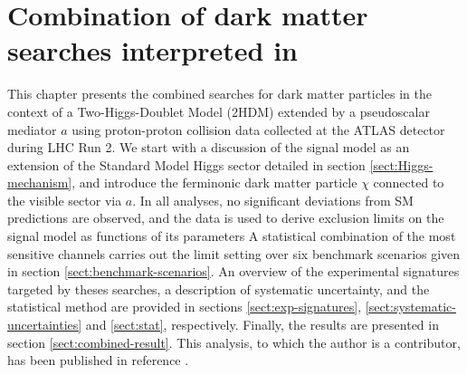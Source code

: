 \chapter{Combination of dark matter searches interpreted in \thdma}
\label{chap:combination-dark-matter-2hdma}

This chapter presents the combined searches for dark matter particles in the context of a Two-Higgs-Doublet Model (2HDM) extended 
by a pseudoscalar mediator $a$ using proton-proton collision data collected at the ATLAS detector during LHC Run 2. 
We start with a discussion of the signal model as an extension of the Standard Model Higgs sector detailed in section \ref{sect:Higgs-mechanism}, 
and introduce the ferminonic dark matter particle $\chi$ connected to the visible sector via $a$.
In all analyses, no significant deviations from SM predictions are observed, and the data is used to derive exclusion limits on the signal model as functions of its parameters
A statistical combination of the most sensitive channels carries out the limit setting over six benchmark scenarios given in section \ref{sect:benchmark-scenarios}.
An overview of the experimental signatures targeted by theses searches, a description of systematic uncertainty, and the statistical method are provided in sections \ref{sect:exp-signatures}, \ref{sect:systematic-uncertainties} and \ref{sect:stat}, respectively.
Finally, the results are presented in section \ref{sect:combined-result}.
This analysis, to which the author is a contributor, has been published in reference \cite{2hdma_comb}.
 
